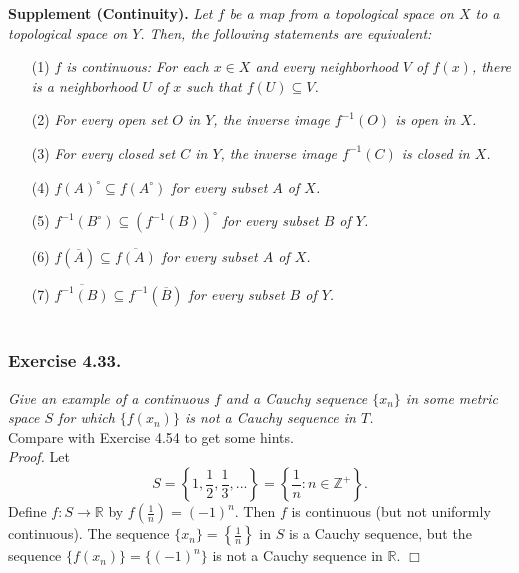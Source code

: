 \documentclass{article}
\begin{document}
\textbf{Supplement (Continuity).}
\emph{Let $f$ be a map from a topological space on $X$
to a topological space on $Y$.
Then, the following statements are equivalent:}
\begin{enumerate}
\item[(1)]
\emph{$f$ is continuous:
For each $x \in X$ and every neighborhood $V$ of $f(x)$,
there is a neighborhood $U$ of $x$ such that $f(U) \subseteq V$.}
\item[(2)]
\emph{For every open set $O$ in $Y$, the inverse image $f^{-1}(O)$
is open in $X$.}
\item[(3)]
\emph{For every closed set $C$ in $Y$, the inverse image $f^{-1}(C)$
is closed in $X$.}
\item[(4)]
\emph{$f(A)^{\circ} \subseteq f(A^{\circ})$ for every subset $A$ of $X$.}
\item[(5)]
\emph{$f^{-1}(B^{\circ}) \subseteq (f^{-1}(B))^{\circ}$ for every subset $B$ of $Y$.}
\item[(6)]
\emph{$f(\overline{A}) \subseteq \overline{f(A)}$ for every subset $A$ of $X$.}
\item[(7)]
\emph{$\overline{f^{-1}(B)} \subseteq f^{-1}(\overline{B})$ for every subset $B$ of $Y$.} \\\\
\end{enumerate}






\subsubsection*{Exercise 4.33.}
\emph{Give an example of a continuous $f$ and a Cauchy sequence $\{x_n\}$
in some metric space $S$ for which $\{f(x_n)\}$ is not a Cauchy sequence in $T$.} \\

Compare with Exercise 4.54 to get some hints. \\

\emph{Proof.}
Let
$$S
= \left\{ 1, \frac{1}{2}, \frac{1}{3}, ... \right\}
= \left\{ \frac{1}{n} : n \in \mathbb{Z}^+ \right\}.$$
Define $f: S \rightarrow \mathbb{R}$ by $f\left(\frac{1}{n}\right) = (-1)^n$.
Then $f$ is continuous (but not uniformly continuous).
The sequence $\{x_n\} = \left\{ \frac{1}{n} \right\}$ in $S$ is a Cauchy sequence,
but the sequence $\{f(x_n)\} = \{(-1)^n\}$ is not a Cauchy sequence in $\mathbb{R}$.
$\Box$ \\\\
\end{document}
